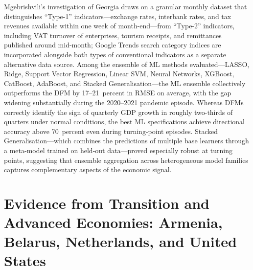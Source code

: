 \documentclass[12pt,a4paper]{report}
\begin{document}
Mgebrishvili's investigation of Georgia draws on a granular monthly
dataset that distinguishes ``Type-1'' indicators---exchange rates,
interbank rates, and tax revenues available within one week of
month-end---from ``Type-2'' indicators, including VAT turnover of
enterprises, tourism receipts, and remittances published around
mid-month; Google Trends search category indices are incorporated
alongside both types of conventional indicators as a separate
alternative data source.\citep{Georgia2022} Among the ensemble of ML
methods evaluated---LASSO, Ridge, Support Vector Regression, Linear
SVM, Neural Networks, XGBoost, CatBoost, AdaBoost, and Stacked
Generalisation---the ML ensemble collectively outperforms the DFM by
17--21~percent in RMSE on average, with the gap widening substantially
during the 2020--2021 pandemic episode. Whereas DFMs correctly identify
the sign of quarterly GDP growth in roughly two-thirds of quarters
under normal conditions, the best ML specifications achieve directional
accuracy above 70~percent even during turning-point episodes. Stacked
Generalisation---which combines the predictions of multiple base
learners through a meta-model trained on held-out data---proved
especially robust at turning points, suggesting that ensemble
aggregation across heterogeneous model families captures complementary
aspects of the economic signal.

\section{Evidence from Transition and Advanced Economies: Armenia, Belarus, Netherlands, and United States}
\end{document}
